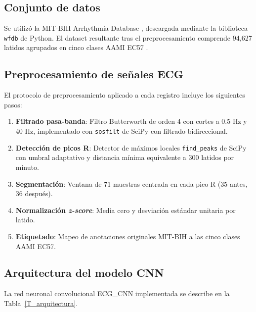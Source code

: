 \documentclass[11pt,spanish]{citedi}
\begin{document}
\subsection{Conjunto de datos}

Se utilizó la MIT-BIH Arrhythmia Database \cite{Moody2001}, descargada mediante la biblioteca \texttt{wfdb} de Python. El dataset resultante tras el preprocesamiento comprende 94,627 latidos agrupados en cinco clases AAMI EC57 \cite{AAMI2012}.

\subsection{Preprocesamiento de señales ECG}

El protocolo de preprocesamiento aplicado a cada registro incluye los siguientes pasos:
\begin{enumerate}
\item \textbf{Filtrado pasa-banda}: Filtro Butterworth de orden 4 con cortes a 0.5 Hz y 40 Hz, implementado con \texttt{sosfilt} de SciPy con filtrado bidireccional.
\item \textbf{Detección de picos R}: Detector de máximos locales \texttt{find\_peaks} de SciPy con umbral adaptativo y distancia mínima equivalente a 300 latidos por minuto.
\item \textbf{Segmentación}: Ventana de 71 muestras centrada en cada pico R (35 antes, 36 después).
\item \textbf{Normalización \textit{z-score}}: Media cero y desviación estándar unitaria por latido.
\item \textbf{Etiquetado}: Mapeo de anotaciones originales MIT-BIH a las cinco clases AAMI EC57.
\end{enumerate}

\subsection{Arquitectura del modelo CNN}

La red neuronal convolucional ECG\_CNN implementada se describe en la Tabla~\ref{T_arquitectura}.
\end{document}
